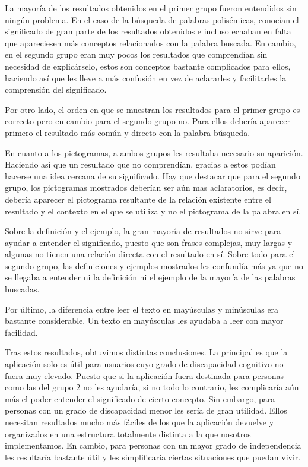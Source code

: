 La mayoría de los resultados obtenidos en el  primer grupo fueron entendidos sin ningún problema. En el caso de la búsqueda de palabras polisémicas, conocían el significado de gran parte de los resultados obtenidos e incluso echaban en falta que apareciesen más conceptos relacionados con la palabra buscada.
En cambio, en el segundo grupo eran muy pocos los resultados que comprendían sin necesidad de explicárselo, estos son conceptos bastante complicados para ellos, haciendo así que les lleve a más confusión en vez de aclararles y facilitarles la comprensión del significado.

Por otro lado, el orden en que se muestran los resultados para el primer grupo es correcto pero en cambio para el segundo grupo no. Para ellos debería aparecer primero el resultado más común y directo con la palabra búsqueda.

En cuanto a los pictogramas, a ambos grupos les resultaba necesario su aparición. Haciendo así que un resultado que no comprendían, gracias a estos podían hacerse una idea cercana de su significado.  Hay que destacar que para el segundo grupo, los pictogramas mostrados deberían ser aún mas aclaratorios, es decir, debería aparecer el pictograma resultante de la relación existente entre el resultado y el contexto en el que se utiliza y no el pictograma de la palabra en sí.

Sobre la definición y el ejemplo, la gran mayoría de resultados no sirve para ayudar a entender el significado, puesto que son frases complejas, muy largas y algunas no tienen una relación directa con el resultado en sí. Sobre todo para el segundo grupo, las definiciones y ejemplos mostrados les confundía más ya que no se llegaba a entender ni la definición ni el ejemplo de la mayoría de las palabras buscadas.

Por último, la diferencia entre leer el texto en mayúsculas y minúsculas era bastante considerable. Un texto en mayúsculas les ayudaba a leer con mayor facilidad.

Tras estos resultados, obtuvimos distintas conclusiones. La principal es que la aplicación solo es útil para usuarios cuyo grado de discapacidad cognitivo no fuera muy elevado.  Puesto que si la aplicación fuera destinada para personas como las del grupo 2 no les ayudaría, si no todo lo contrario, les complicaría aún más el poder entender el significado de cierto concepto. Sin embargo, para personas con un grado de discapacidad menor les sería de gran utilidad.
Ellos necesitan resultados mucho más fáciles de los que la aplicación devuelve y organizados en una estructura totalmente distinta a la que nosotros implementamos. En cambio, para personas con un mayor grado de independencia les resultaría bastante útil y les simplificaría ciertas situaciones que puedan vivir.

